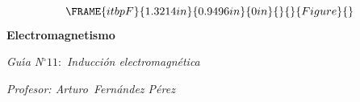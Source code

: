 \documentclass[12pt]{article}
\begin{document}
\begin{center}
\begin{equation*}
\FRAME{itbpF}{1.3214in}{0.9496in}{0in}{}{}{Figure}{\special{language
"Scientific Word";type "GRAPHIC";maintain-aspect-ratio TRUE;display
"USEDEF";valid_file "T";width 1.3214in;height 0.9496in;depth
0in;original-width 1.3552in;original-height 0.9669in;cropleft "0";croptop
"1";cropright "1";cropbottom "0";tempfilename
'R45S6500.bmp';tempfile-properties "XPR";}}
\end{equation*}%
\textbf{Electromagnetismo}

\emph{Gu\'{\i}a N}$%
{{}^\circ}%
11:$ \emph{Inducci\'{o}n electromagn\'{e}tica}

\textit{Profesor: Arturo\ Fern\'{a}ndez P\'{e}rez}
\end{center}
\end{document}
